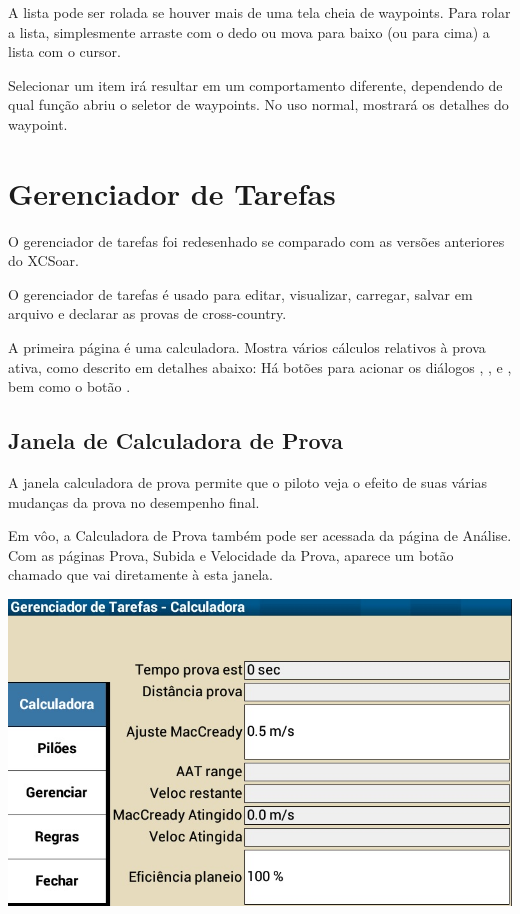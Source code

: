 A lista pode ser rolada se houver mais de uma tela cheia de waypoints.  Para rolar a lista, simplesmente arraste com o dedo ou mova para baixo (ou para cima) a lista com o cursor. 

Selecionar um item irá resultar em um comportamento diferente, dependendo de qual função abriu o seletor de waypoints.  No uso normal, mostrará os detalhes do waypoint.

\section{Gerenciador de Tarefas}\label{sec:task-manager-dialog}
\begin{it}  O gerenciador de tarefas foi redesenhado se comparado com as versões anteriores do XCSoar.\end{it}

O gerenciador de tarefas é usado para editar, visualizar, carregar, salvar em arquivo e declarar as provas de cross-country.

A primeira página é uma calculadora.  Mostra vários cálculos relativos à prova ativa, como descrito em detalhes abaixo:  Há botões para acionar os diálogos , , 
e , bem como o botão .

\subsection*{Janela de Calculadora de Prova}\label{sec:task-calc-dial}
A janela calculadora de prova permite que o piloto veja o efeito de suas várias mudanças da prova no desempenho final.

Em vôo, a Calculadora de Prova também pode ser acessada da página de Análise.  Com as páginas Prova, Subida e Velocidade da Prova, aparece um botão chamado   que vai diretamente à esta janela.
 



\begin{center}
\includegraphics[angle=0,width=0.8\linewidth,keepaspectratio='true']{figures/dialog-taskcalculator.png}
\end{center}

